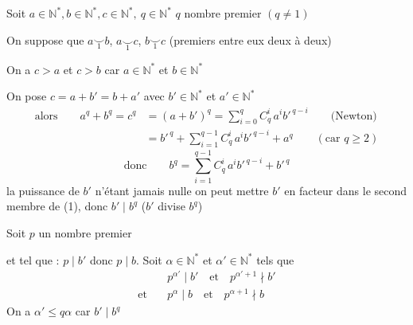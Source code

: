  Soit $a\in\mathbb N^*,b\in\mathbb N^*,c\in\mathbb N^*,\ q\in\mathbb N^*$ \quad $q$ nombre premier $(q\ne1)$

On suppose que $a\mathrel{\underset{1}{\smile}}b$, $a\mathrel{\underset{1}{\smile}}c$, $b\mathrel{\underset{1}{\smile}}c$ (premiers entre eux deux à deux)

On a $c>a$ et $c>b$ car $a\in\mathbb N^*$ et $b\in\mathbb N^*$

On pose $c=a+b'=b+a'$ avec $b'\in\mathbb N^*$ et $a'\in\mathbb N^*$
\[
\begin{aligned}
\text{alors}\qquad a^q+b^q=c^q&=(a+b')^q=\sum_{i=0}^{q}C_q^i\,a^i b'^{\,q-i}\qquad\text{(Newton)}\\
 &=b'^{\,q}+\sum_{i=1}^{q-1}C_q^i\,a^i b'^{\,q-i}+a^q\qquad(\text{car }q\geqslant2)
\end{aligned}
\]
\[
\text{donc}\qquad b^q=\sum_{i=1}^{q-1}C_q^i\,a^i b'^{\,q-i}+b'^{\,q}\tag*{(1)}
\]
la puissance de $b'$ n'étant jamais nulle on peut mettre $b'$ en facteur dans le second membre de (1), donc $b'\mid b^q$ ($b'$ divise $b^q$)

Soit $p$ un nombre premier
\begingroup
\renewcommand{\ULthickness}{0pt}
\endgroup
et tel que : $p\mid b'$ donc $p\mid b$. Soit $\alpha\in\mathbb N^*$ et $\alpha'\in\mathbb N^*$ tels que
\[
\begin{aligned}
 &p^{\alpha'}\mid b'\quad\text{et}\quad p^{\alpha'+1}\nmid b'\\
 \text{et}\quad &p^\alpha\mid b\quad\text{et}\quad p^{\alpha+1}\nmid b
\end{aligned}
\]
On a $\alpha'\leqslant q\alpha$ car $b'\mid b^q$

